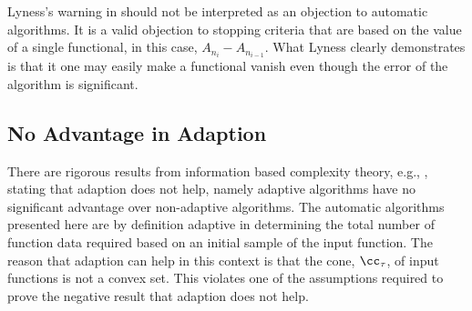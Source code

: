 \documentclass[]{elsarticle}
\theoremstyle{definition}
\theoremstyle{remark}
\begin{document}
Lyness's warning in \cite{Lyn83} should not be interpreted as an objection to automatic algorithms.  It is a valid objection to stopping criteria that are based on the value of a single functional, in this case, $A_{n_{i}}-A_{n_{i-1}}$.  What Lyness clearly demonstrates is that it one may easily make a functional vanish even though the error of the algorithm is significant.

\subsection{No Advantage in Adaption}

There are rigorous results from information based complexity theory, e.g., \citep[Chapter 4, Theorem 5.2.1]{TraWasWoz88}, stating that adaption does not help, namely adaptive algorithms have no significant advantage over non-adaptive algorithms. The automatic algorithms presented here are by definition adaptive in determining the total number of function data required based on an initial sample of the input function.  The reason that adaption can help in this context is that the cone, $\cc_{\tau}$, of input functions is not a convex set.  This violates one of the assumptions required to prove the negative result that adaption does not help.
\end{document}
